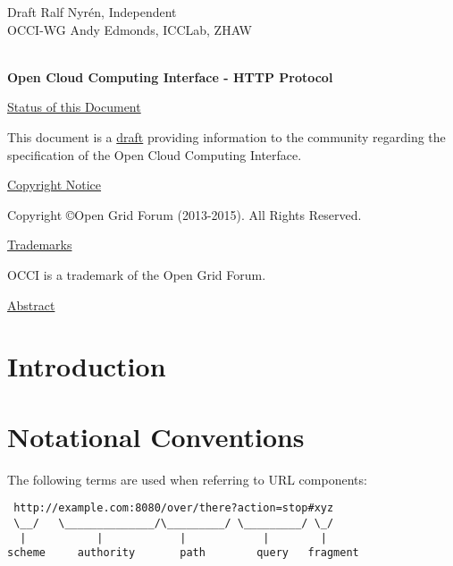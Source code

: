 \documentclass[10pt,a4paper]{article}
\begin{document}
\thispagestyle{empty}

Draft \hfill Ralf Nyrén, Independent \\
OCCI-WG \hfill Andy Edmonds, ICCLab, ZHAW \\
\\

\vspace*{0.5in}

\begin{Large}
\textbf{Open Cloud Computing Interface - HTTP Protocol}
\end{Large}

\vspace*{0.5in}

\underline{Status of this Document}

This document is a \underline{draft} providing information to the community regarding the specification of the Open Cloud Computing Interface.

\underline{Copyright Notice}

Copyright \copyright Open Grid Forum (2013-2015). All Rights Reserved.

\underline{Trademarks}

OCCI is a trademark of the Open Grid Forum.

\underline{Abstract}




\newpage
\tableofcontents
\newpage

\section{Introduction}
\label{sec:intro}


\section{Notational Conventions}
\label{sec:not_conv}


The following terms \cite{rfc3986} are used when referring to URL
components:

\begin{verbatim}
 http://example.com:8080/over/there?action=stop#xyz
 \__/   \______________/\_________/ \_________/ \_/
  |           |            |            |        |
scheme     authority       path        query   fragment
\end{verbatim}
\end{document}
